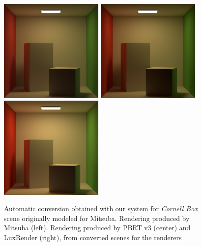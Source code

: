 \begin{figure}
\centering
\includegraphics[width=2in]{figs/4_results/cornell-box/1_from_mitsuba.png}
\includegraphics[width=2in]{figs/4_results/cornell-box/2_to_pbrt.png}
\includegraphics[width=2in]{figs/4_results/cornell-box/3_to_lux.png}
\caption{Automatic conversion obtained with our system for \textit{Cornell Box}
scene originally modeled for Mitsuba. Rendering produced by Mitsuba (left).
Rendering produced by PBRT v3 (center) and LuxRender (right),
from converted scenes for the renderers}
\label{fig:cornell}
\end{figure}

